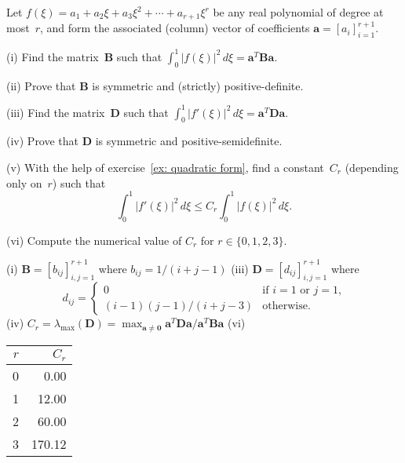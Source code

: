 \begin{Exercises}
\exercise\label{ex: polynomial derivative}
Let $f(\xi)=a_1+a_2\xi+a_3\xi^2+\cdots+a_{r+1}\xi^r$ be any real polynomial of 
degree at most~$r$, and form the associated (column) vector of coefficients
$\boldsymbol{a}=[a_i]_{i=1}^{r+1}$.
\begin{description}
\item{(i)} Find the matrix~$\boldsymbol{B}$ such that 
$\int_0^1|f(\xi)|^2\,d\xi=\boldsymbol{a}^T\boldsymbol{B}\boldsymbol{a}$. 
\item{(ii)} Prove that $\boldsymbol{B}$ is symmetric and (strictly) 
positive-definite.
\item{(iii)} Find the matrix~$\boldsymbol{D}$ such that
$\int_0^1|f'(\xi)|^2\,d\xi=\boldsymbol{a}^T\boldsymbol{D}\boldsymbol{a}$. 
\item{(iv)} Prove that $\boldsymbol{D}$ is symmetric and positive-semidefinite.
\item{(v)} With the help of exercise~\ref{ex: quadratic form}, find a 
constant~$C_r$ (depending only on~$r$) such that
\[
\int_0^1|f'(\xi)|^2\,d\xi\le C_r\int_0^1|f(\xi)|^2\,d\xi.
\]
\item{(vi)} Compute the numerical value of $C_r$ for $r\in\{0,1,2,3\}$.
\end{description}
\begin{ans}
(i) $\boldsymbol{B}=[b_{ij}]_{i,j=1}^{r+1}$ where $b_{ij}=1/(i+j-1)$\quad
(iii) $\boldsymbol{D}=[d_{ij}]_{i,j=1}^{r+1}$ where 
\[
d_{ij}=\begin{cases}
    0&\text{if $i=1$ or $j=1$,}\\
    (i-1)(j-1)/(i+j-3)&\text{otherwise.}
\end{cases}
\]
(iv) $C_r=\lambda_{\max}(\boldsymbol{D})=\max_{\boldsymbol{a}\ne\boldsymbol{0}}
\boldsymbol{a}^T\boldsymbol{D}\boldsymbol{a}/
\boldsymbol{a}^T\boldsymbol{B}\boldsymbol{a}$ 
(vi)
\begin{center}
\renewcommand{\arraystretch}{1.25}
\begin{tabular}{r|r}
$r$&$C_r$\\
\hline
   0&     0.00\\
   1&    12.00\\
   2&    60.00\\
   3&   170.12
\end{tabular}
\end{center}
\end{ans}


\end{Exercises}
